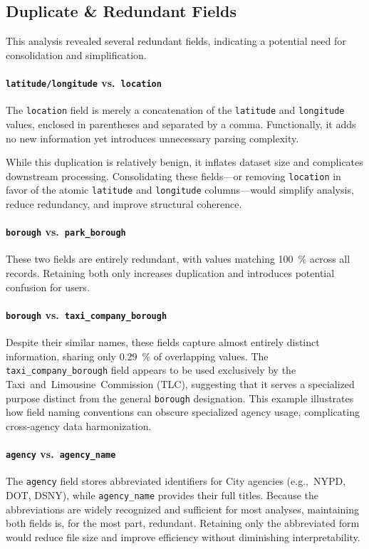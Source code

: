 \documentclass[linenumber]{jdsart}
\begin{document}
\subsection{Duplicate \& Redundant Fields}
\label{subsec:redundant}
This analysis revealed several redundant fields, indicating a potential 
need for consolidation and simplification.

\paragraph{\texttt{latitude/longitude} vs.~\texttt{location}}  
The \texttt{location} field is merely a concatenation of the 
\texttt{latitude} and \texttt{longitude} values, enclosed in parentheses 
and separated by a comma. Functionally, it adds no new information yet introduces unnecessary parsing 
complexity. 

While this duplication is relatively benign, it inflates dataset size 
and complicates downstream processing. 
Consolidating these fields—or removing \texttt{location} in favor of the 
atomic \texttt{latitude} and \texttt{longitude} columns—would simplify 
analysis, reduce redundancy, and improve structural coherence.

\paragraph{\texttt{borough} vs.~\texttt{park\_borough}}  
These two fields are entirely redundant, with values matching 
\SI{100}{\percent} across all records. Retaining both 
only increases duplication and introduces potential 
confusion for users.

\paragraph{\texttt{borough} vs.~\texttt{taxi\_company\_borough}}  
Despite their similar names, these fields capture almost entirely distinct 
information, sharing only \SI{0.29}{\percent} of overlapping values. 
The \texttt{taxi\_company\_borough} field appears to be used exclusively 
by the Taxi~and~Limousine~Commission (\textsc{TLC}), suggesting that it 
serves a specialized purpose distinct from the general 
\texttt{borough} designation. This example illustrates 
how field naming conventions can obscure 
specialized agency usage, complicating cross-agency data harmonization.

\paragraph{\texttt{agency} vs.~\texttt{agency\_name}}  
The \texttt{agency} field stores abbreviated identifiers for City agencies 
(e.g.,~\textsc{NYPD}, \textsc{DOT}, \textsc{DSNY}), 
while \texttt{agency\_name} provides their full titles. 
Because the abbreviations are widely recognized and sufficient for most analyses, 
maintaining both fields is, for the most part, redundant. 
Retaining only the abbreviated form would reduce file size and improve efficiency 
without diminishing interpretability.
\end{document}
